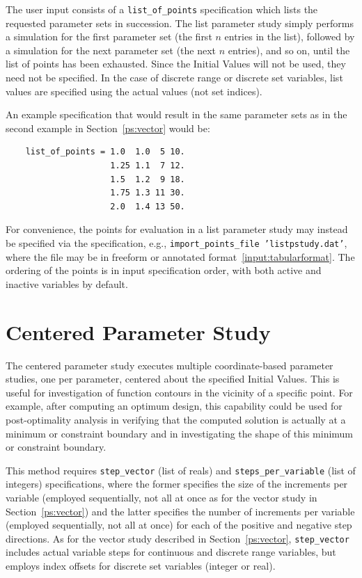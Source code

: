 The user input consists of a \texttt{list\_of\_points} specification
which lists the requested parameter sets in succession. The list
parameter study simply performs a simulation for the first parameter
set (the first $n$ entries in the list), followed by a simulation for
the next parameter set (the next $n$ entries), and so on, until the
list of points has been exhausted. Since the Initial Values will not
be used, they need not be specified.  In the case of discrete range or
discrete set variables, list values are specified using the actual
values (not set indices).

An example specification that would result in the same parameter sets
as in the second example in Section~\ref{ps:vector} would be:
\begin{small}
\begin{verbatim}
    list_of_points = 1.0  1.0  5 10.
                     1.25 1.1  7 12.
                     1.5  1.2  9 18.
                     1.75 1.3 11 30.
                     2.0  1.4 13 50.
\end{verbatim}
\end{small}

For convenience, the points for evaluation in a list parameter study
may instead be specified via the 
specification, e.g., {\tt import\_points\_file 'listpstudy.dat'},
where the file  may be in freeform or annotated
format~\ref{input:tabularformat}.  The ordering of the points is in
input specification order, with both active and inactive variables by
default.

\section{Centered Parameter Study}\label{ps:centered}

The centered parameter study executes multiple coordinate-based
parameter studies, one per parameter, centered about the specified
Initial Values. This is useful for investigation of function contours
in the vicinity of a specific point. For example, after computing an
optimum design, this capability could be used for post-optimality
analysis in verifying that the computed solution is actually at a
minimum or constraint boundary and in investigating the shape of this
minimum or constraint boundary.

This method requires \texttt{step\_vector} (list of reals) and
\texttt{steps\_per\_variable} (list of integers) specifications, where 
the former specifies the size of the increments per variable (employed
sequentially, not all at once as for the vector study in
Section~\ref{ps:vector}) and the latter specifies the number of
increments per variable (employed sequentially, not all at once) for
each of the positive and negative step directions.  As for the vector
study described in Section~\ref{ps:vector}, \texttt{step\_vector}
includes actual variable steps for continuous and discrete range
variables, but employs index offsets for discrete set variables
(integer or real).

